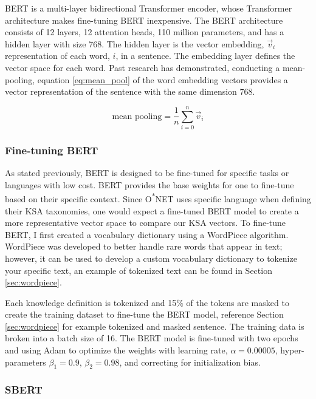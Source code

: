 \documentclass[12pt]{article}
\begin{document}
BERT is a multi-layer bidirectional Transformer encoder, whose Transformer architecture makes fine-tuning BERT inexpensive.\cite{bert} The BERT architecture consists of 12 layers, 12 attention heads, 110 million parameters, and has a hidden layer with size 768.\cite{bert} The hidden layer is the vector embedding, $\vec{v}_i$ representation of each word, $i$, in a sentence. The embedding layer defines the vector space for each word. Past research has demonstrated, conducting a mean-pooling, equation \ref{eq:mean_pool} of the word embedding vectors provides a vector representation of the sentence with the same dimension 768.\cite{labor_space, sbert}

\begin{equation}
    \text{mean pooling} = \frac{1}{n}\sum_{i=0}^n \vec{v}_i
    \label{eq:mean_pool}
\end{equation}

\subsubsection{Fine-tuning BERT}

As stated previously, BERT is designed to be fine-tuned for specific tasks or languages with low cost. BERT provides the base weights for one to fine-tune based on their specific context. Since O\textsuperscript{*}NET uses specific language when defining their KSA taxonomies, one would expect a fine-tuned BERT model to create a more representative vector space to compare our KSA vectors. To fine-tune BERT, I first created a vocabulary dictionary using a WordPiece algorithm. WordPiece was developed to better handle rare words that appear in text; however, it can be used to develop a custom vocabulary dictionary to tokenize your specific text\cite{wordpiece}, an example of tokenized text can be found in Section \ref{sec:wordpiece}.

Each knowledge definition is tokenized and 15\% of the tokens are masked to create the training dataset to fine-tune the BERT model, reference Section \ref{sec:wordpiece} for example tokenized and masked sentence. The training data is broken into a batch size of 16. The BERT model is fine-tuned with two epochs and using Adam to optimize the weights with learning rate, $\alpha = 0.00005$, hyper-parameters $\beta_1 = 0.9$, $\beta_2 = 0.98$, and correcting for initialization bias.\cite{kingma2017adam}

\subsubsection{SBERT}
\end{document}
